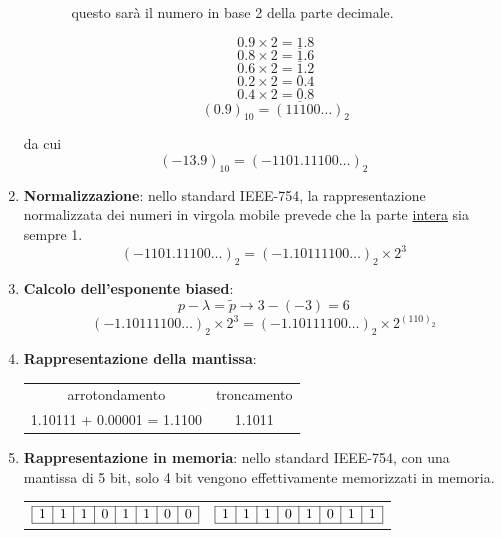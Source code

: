 \documentclass{article}
\begin{document}
\begin{example}
\begin{enumerate}
\begin{itemize}
\begin{enumerate}
                            questo sarà il numero in base 2 della parte
                            decimale.
                    \end{enumerate}
                    $$0.9\times2=\underline{1}.8$$
                    $$0.8\times2=\underline{1}.6$$
                    $$0.6\times2=\underline{1}.2$$
                    $$0.2\times2=\underline{0}.4$$
                    $$0.4\times2=\underline{0}.8$$
                    $$(0.9)_{10}=(11100\ldots)_2$$
            \end{itemize}
            da cui
            $$(-13.9)_{10}=(-1101.11100\ldots)_2$$
        \item \textbf{Normalizzazione}:
        nello standard IEEE-754, la rappresentazione normalizzata dei numeri
        in virgola mobile prevede che la parte \underline{intera} sia sempre
        1.
            $$(-1101.11100\ldots)_2=(-1.10111100\ldots)_2\times2^{3}$$
        \item \textbf{Calcolo dell'esponente biased}:
            $$p-\lambda=\tilde{p}\rightarrow3-(-3)=6$$
            $$(-1.10111100\ldots)_2\times2^3=(-1.10111100\ldots)_2\times2^{(110)_2}$$
        \item \textbf{Rappresentazione della mantissa}:
            \begin{center}
               \begin{tabular}{cc}
                    arrotondamento & troncamento \\ 
                   1.10111 + 0.00001 = 1.1100 & 1.1011
               \end{tabular} 
            \end{center}
        \item \textbf{Rappresentazione in memoria}: nello standard IEEE-754,
        con una mantissa di 5 bit, solo 4 bit vengono effettivamente memorizzati in memoria.
        \begin{center}
           \begin{tabular}{cc}
               $
               \begin{array}{|c|c|c|c|c|c|c|c|}
                   \hline
                   1 & 1 & 1 & 0 & 1 & 1 & 0 & 0\\
                   \hline
               \end{array} 
               $ 
                &
                $
                \begin{array}{|c|c|c|c|c|c|c|c|}
                    \hline
                    1 & 1 & 1 & 0 & 1 & 0 & 1 & 1 \\
                    \hline
                \end{array}
                $
           \end{tabular} 
        \end{center}
    \end{enumerate}
\end{example}
\end{document}
